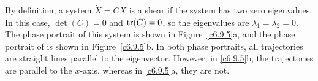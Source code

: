 \begin{figure}[htb]
                       \centerline{%
                       }
\end{figure}

By definition, a system $\dot{X} = CX$ is a shear if the system has two
zero eigenvalues.  In this case, $\det(C) = 0$ and ${\rm tr}(C) = 0$, so
the eigenvalues are $\lambda_1 = \lambda_2 = 0$.  The phase portrait of
this system is shown in Figure~\ref{c6.9.5}a, and the phase portrait of
 is shown in Figure~\ref{c6.9.5}b.  In both phase portraits,
all trajectories are straight lines parallel to the eigenvector.  However,
in \ref{c6.9.5}b, the trajectories are parallel to the $x$-axis, whereas
in \ref{c6.9.5}a, they are not.

\begin{figure}[htb]
                       \centerline{%
                       }
\end{figure}





